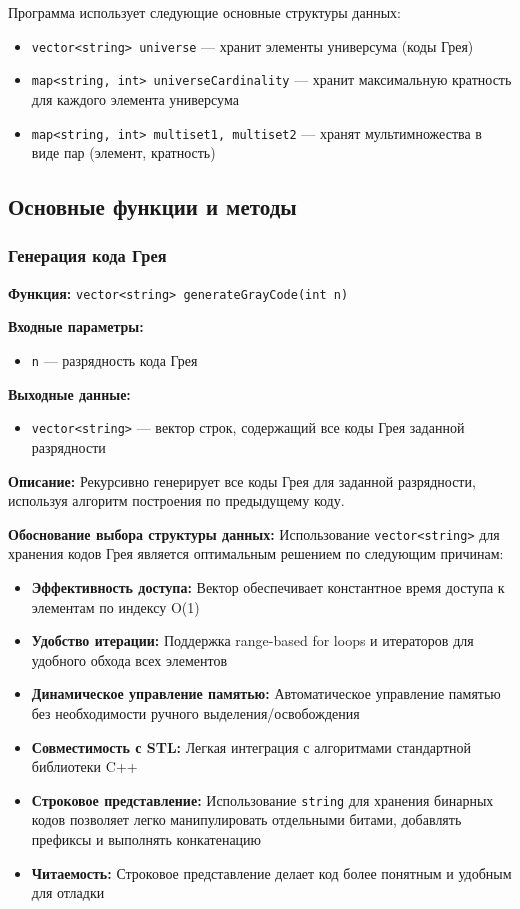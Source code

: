 \documentclass[12pt,a4paper]{article}
\begin{document}
Программа использует следующие основные структуры данных:

\begin{itemize}
    \item \texttt{vector<string> universe} — хранит элементы универсума (коды Грея)
    \item \texttt{map<string, int> universeCardinality} — хранит максимальную кратность для каждого элемента универсума
    \item \texttt{map<string, int> multiset1, multiset2} — хранят мультимножества в виде пар (элемент, кратность)
\end{itemize}

\subsection{Основные функции и методы}

\subsubsection{Генерация кода Грея}

\textbf{Функция:} \texttt{vector<string> generateGrayCode(int n)}

\textbf{Входные параметры:}
\begin{itemize}
    \item \texttt{n} — разрядность кода Грея
\end{itemize}

\textbf{Выходные данные:}
\begin{itemize}
    \item \texttt{vector<string>} — вектор строк, содержащий все коды Грея заданной разрядности
\end{itemize}

\textbf{Описание:} Рекурсивно генерирует все коды Грея для заданной разрядности, используя алгоритм построения по предыдущему коду.

\textbf{Обоснование выбора структуры данных:} Использование \texttt{vector<string>} для хранения кодов Грея является оптимальным решением по следующим причинам:
\begin{itemize}
    \item \textbf{Эффективность доступа:} Вектор обеспечивает константное время доступа к элементам по индексу O(1)
    \item \textbf{Удобство итерации:} Поддержка range-based for loops и итераторов для удобного обхода всех элементов
    \item \textbf{Динамическое управление памятью:} Автоматическое управление памятью без необходимости ручного выделения/освобождения
    \item \textbf{Совместимость с STL:} Легкая интеграция с алгоритмами стандартной библиотеки C++
    \item \textbf{Строковое представление:} Использование \texttt{string} для хранения бинарных кодов позволяет легко манипулировать отдельными битами, добавлять префиксы и выполнять конкатенацию
    \item \textbf{Читаемость:} Строковое представление делает код более понятным и удобным для отладки
\end{itemize}
\end{document}
